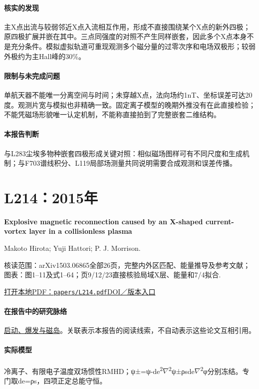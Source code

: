 \paragraph{核实的发现}主X点出流与较弱邻近X点入流相互作用，形成不直接围绕某个X点的新外四极；原四极扩展并嵌在其中。三点同强度的对照不产生同样嵌套，因此多个X点本身不是充分条件。模拟虚拟轨道可重现观测多个磁分量的过零次序和电场双极形；较弱外极约为主Hall峰的30\%。

\paragraph{限制与未完成问题}单航天器不能唯一分离空间与时间；未穿越X点，法向场约1nT、坐标误差可达20度。观测片宽与模拟也非精确一致。固定离子模型的晚期外推没有在此直接检验；不能凭磁场形貌唯一认定机制，不能称直接拍到了完整嵌套二维结构。

\paragraph{本报告判断}与L283尘埃多物种嵌套四极形成关键对照：相似磁场图样可有不同尺度和生成机制；与F703谱线积分、L119局部场测量共同说明需要合成观测和误差传播。

\section{L214：2015年}\label{paper:L214}

\textbf{Explosive magnetic reconnection caused by an X-shaped current-vortex layer in a collisionless plasma}\citep{L214}\

Makoto Hirota;  Yuji Hattori;  P. J. Morrison.

\textsf{核读范围：}arXiv1503.06865全部26页，完整内外区匹配、能量推导及参考文献；\textsf{图表：}图1–11及式1–64；页9/12/23直接核验局域X层、能量和7/4拟合.

\href{run:papers/L214.pdf}{打开本地PDF：\texttt{papers/L214.pdf}}\quad\href{https://doi.org/10.1063/1.4921329}{DOI／版本入口}

\paragraph{在报告中的研究脉络}\hyperref[story:onset]{启动、爆发与磁岛}。关联表示本报告的阅读线索，不自动表示这些论文互相引用。

\paragraph{实际模型}冷离子、有限电子温度双场惯性RMHD；ψ±=ψ-de\textsuperscript{2}\ensuremath{\nabla}\textsuperscript{2}ψ±ρsde\ensuremath{\nabla}\textsuperscript{2}φ分别冻结。专门取de=ρs，四项正定总能守恒。

